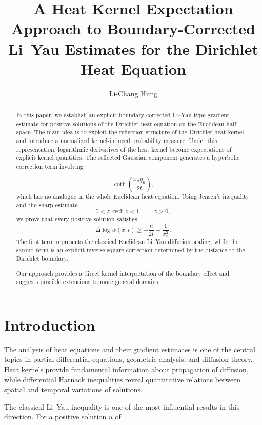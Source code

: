 \documentclass[11pt]{amsart}
\title[A Heat Kernel Expectation Approach]{
A Heat Kernel Expectation Approach to Boundary-Corrected
Li--Yau Estimates for the Dirichlet Heat Equation
}
\author{Li-Chang Hung}
\DeclareMathOperator{\csch}{csch}
\theoremstyle{definition}
\theoremstyle{remark}
\begin{document}
\maketitle



\begin{abstract}

In this paper, we establish an explicit boundary-corrected
Li--Yau type gradient estimate for positive solutions of the
Dirichlet heat equation on the Euclidean half-space. The main idea is to exploit the reflection structure of the Dirichlet heat kernel and introduce a normalized kernel-induced
probability measure. Under this representation, logarithmic
derivatives of the heat kernel become expectations of explicit
kernel quantities. The reflected Gaussian component generates a hyperbolic correction
term involving

\[
\coth\left(\frac{x_n y_n}{2t}\right),
\]
which has no analogue in the whole Euclidean heat equation. Using Jensen's inequality and the sharp estimate
\[
0<z\,\csch z<1 ,
\qquad z>0,
\]
we prove that every positive solution satisfies
\[
\Delta\log w(x,t)
\geq
-\frac n{2t}
-\frac1{x_n^2}.
\]
The first term represents the classical Euclidean Li--Yau diffusion
scaling, while the second term is an explicit inverse-square
correction determined by the distance to the Dirichlet boundary.

Our approach provides a direct kernel interpretation of the
boundary effect and suggests possible extensions to more general
domains.

\end{abstract}



\section{Introduction}


The analysis of heat equations and their gradient estimates is one
of the central topics in partial differential equations, geometric
analysis, and diffusion theory. Heat kernels provide fundamental
information about propagation of diffusion, while differential
Harnack inequalities reveal quantitative relations between spatial
and temporal variations of solutions.


The classical Li--Yau inequality is one of the most influential
results in this direction. For a positive solution $u$ of
\end{document}

